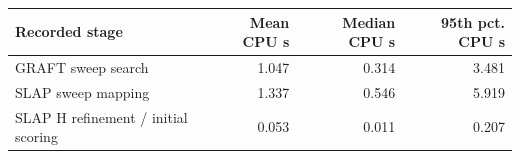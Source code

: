 \begin{tabular}{@{}lrrr@{}}\toprule
Recorded stage & Mean CPU s & Median CPU s & 95th pct. CPU s\\\midrule
GRAFT sweep search & 1.047 & 0.314 & 3.481\\
SLAP sweep mapping & 1.337 & 0.546 & 5.919\\
SLAP H refinement / initial scoring & 0.053 & 0.011 & 0.207\\
\bottomrule\end{tabular}
